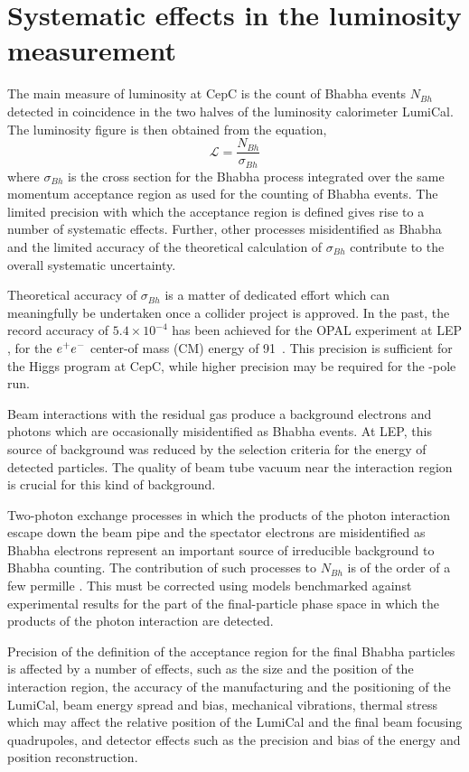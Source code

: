 \section{Systematic effects in the luminosity measurement}
\label{sec:lumi_systematics}
The main measure of luminosity at CepC is the count of Bhabha events $N_{Bh}$ detected in coincidence in the two halves of the luminosity calorimeter LumiCal. The luminosity figure is then obtained from the equation,
\begin{equation}\label{eq:lumi}
  \mathcal{L} = \frac{N_{Bh}}{\sigma_{Bh}}
\end{equation}
where $\sigma_{Bh}$ is the cross section for the Bhabha process integrated over the same momentum acceptance region as used for the counting of Bhabha events. The limited precision with which the acceptance region is defined gives rise to a number of systematic effects. Further, other processes misidentified as Bhabha and the limited accuracy of the theoretical calculation of $\sigma_{Bh}$ contribute to the overall systematic uncertainty.

Theoretical accuracy of $\sigma_{Bh}$ is a matter of dedicated effort which can meaningfully be undertaken once a collider project is approved. In the past, the record accuracy of $5.4\times10^{-4}$ has been achieved for the OPAL experiment at LEP \cite{opal2000}, for the $e^+ e^-$ center-of mass (CM) energy of 91~\GeV. This precision is sufficient for the Higgs program at CepC, while higher precision may be required for the \Zboson-pole run.

Beam interactions with the residual gas produce a background electrons and photons which are occasionally misidentified as Bhabha events. At LEP, this source of background was reduced by the selection criteria for the energy of detected particles. The quality of beam tube vacuum near the interaction region is crucial for this kind of background.

Two-photon exchange processes in which the products of the photon interaction escape down the beam pipe and the spectator electrons are misidentified as Bhabha electrons represent an important source of irreducible background to Bhabha counting. The contribution of such processes to $N_{Bh}$ is of the order of a few permille \cite{Boz13}. This must be corrected using models benchmarked against experimental results for the part of the final-particle phase space in which the products of the photon interaction are detected.

Precision of the definition of the acceptance region for the final Bhabha particles is affected by a number of effects, such as the size and the position of the interaction region, the accuracy of the manufacturing and the positioning of the LumiCal, beam energy spread and bias, mechanical vibrations, thermal stress which may affect the relative position of the LumiCal and the final beam focusing quadrupoles, and detector effects such as the precision and bias of the energy and position reconstruction.

